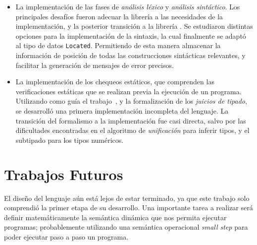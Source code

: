 \begin{itemize}
\item
La implementación de las fases de \textit{análisis léxico} y \textit{análisis sintáctico}.
Los principales desafíos fueron adecuar la librería \Parsec{} a las necesidades de la implementación, y la posterior transición a la librería \Megaparsec{}.
Se estudiaron distintas opciones para la implementación de la sintaxis, la cual finalmente se adaptó al tipo de datos \lstinline[style = haskell]{Located}.
Permitiendo de esta manera almacenar la información de posición de todas las construcciones sintácticas relevantes, y facilitar la generación de mensajes de error precisos.
\item
La implementación de los chequeos estáticos, que comprenden las verificaciones estáticas que se realizan previa la ejecución de un programa.
Utilizando como guía el trabajo~\cite{MonadicTC}, y la formalización de los \textit{juicios de tipado}, se desarrolló una primera implementación incompleta del lenguaje.
La transición del formalismo a la implementación fue casi directa, salvo por las dificultades encontradas en el algoritmo de \textit{unificación} para inferir tipos, y el subtipado para los tipos numéricos.
\end{itemize}

\section{Trabajos Futuros}

El diseño del lenguaje aún está lejos de estar terminado, ya que este trabajo solo comprendió la primer etapa de su desarrollo.
Una importante tarea a realizar será definir matemáticamente la semántica dinámica que nos permita ejecutar programas; probablemente utilizando una semántica operacional \textit{small step} para poder ejecutar paso a paso un programa.

